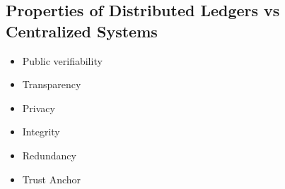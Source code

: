 \documentclass[12pt, a4paper]{report}
\begin{document}
\begin{multicols*}{2}
\section{Properties of Distributed Ledgers vs Centralized Systems}
\begin{itemize}
	\item Public verifiability
	\item Transparency
	\item Privacy
	\item Integrity
	\item Redundancy
	\item Trust Anchor
\end{itemize}


\end{multicols*}
\end{document}

